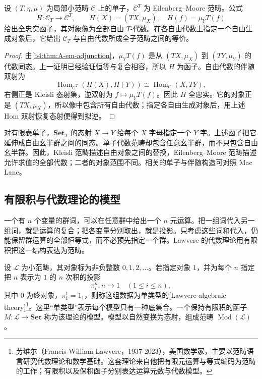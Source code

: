 \begin{proposition}\label{b4:prop:A-kleisli-free-algebras}
	设 \((T,\eta,\mu)\) 为局部小范畴 \(\mathcal C\) 上的单子，\(\mathcal C^T\) 为 Eilenberg–Moore 范畴。公式
	\[
		H:\mathcal C_T\longrightarrow\mathcal C^T, \qquad H(X)=(TX,\mu_X),\quad H(f)=\mu_YT(f)
	\]
	给出全忠实函子，其对象像为全部自由 \(T\)-代数。在各自由代数上指定一个自由生成对象后，它给出 \(\mathcal C_T\) 与自由代数所成全子范畴之间的等价。
\end{proposition}
\begin{proof}
	由\cref{b4:thm:A-em-adjunction}，\(\mu_YT(f)\) 是从 \((TX,\mu_X)\) 到 \((TY,\mu_Y)\) 的代数同态。上一证明已经验证恒等与复合相容，所以 \(H\) 为函子。自由代数的伴随双射为
	\[
		\operatorname{Hom}_{\mathcal C^T}(H(X),H(Y)) \cong\operatorname{Hom}_{\mathcal C}(X,TY),
	\]
	右侧正是 Kleisli 态射集，逆双射为 \(f\mapsto\mu_YT(f)\)。因此 \(H\) 全忠实。它的对象正是 \((TX,\mu_X)\)，所以像中包含所有自由代数；指定各自由生成对象后，用上述 Hom 双射恢复态射便得到拟逆。
\end{proof}

对有限表单子，\(\mathbf{Set}_T\) 的态射 \(X\to Y\) 给每个 \(X\) 字母指定一个 \(Y\) 字。上述函子把它延伸成自由幺半群之间的同态。单子代数范畴却包含任意幺半群，而不只包含自由幺半群。因此，Kleisli 范畴描述自由对象之间的替换，Eilenberg–Moore 范畴描述允许求值的全部代数；二者的对象范围不同。相关的单子与伴随构造可对照 Mac Lane\cite[Chapter VI]{MacLane1998Categories}。

\subsection{有限积与代数理论的模型}
\label{b4:subsec:A05:03}

一个有 \(n\) 个变量的群词，可以在任意群中给出一个 \(n\) 元运算。把一组词代入另一组词，就是运算的复合；把各变量分别取出，就是投影。只考虑这些词和代入，仍能保留群运算的全部恒等式，而不必预先指定一个群。Lawvere 的代数理论用有限积把这一结构表达为范畴。

\begin{definition}\label{b4:def:A-lawvere-theory}
	设 \(\mathcal L\) 为小范畴，其对象标为非负整数 \(0,1,2,\ldots\)。若指定对象 \(1\)，并为每个 \(n\) 指定把 \(n\) 表示为 \(1\) 的 \(n\) 次积的投影
	\[
		\pi_i^n:n\longrightarrow1\quad(1\le i\le n),
	\]
	其中 \(0\) 为终对象，\(\pi_1^1=1_1\)，则称这组数据为单类型的[Lawvere algebraic theory]\footnote{劳维尔（Francis William Lawvere，1937-2023），美国数学家，主要以范畴语言研究代数理论和数学基础。这套理论来自他把有限元运算与等式编码为范畴的工作；有限积以及保积函子分别表达运算元数与代数模型。}。这里“单类型”表示每个模型只有一种底集合。一个保持有限积的函子 \(M:\mathcal L\to\mathbf{Set}\) 称为该理论的模型。模型以自然变换为态射，组成范畴 \(\operatorname{Mod}(\mathcal L)\)。
\end{definition}

